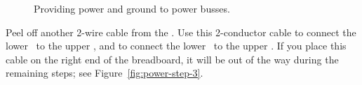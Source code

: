 \begin{figure}
    \centering
    \hfil
    \hfil
    \caption{Providing power and ground to power busses.}
\end{figure}

Peel off another 2-wire cable from the \rainbow.
Use this 2-conductor cable to connect the lower \power\ to the upper \power, and to connect the lower \ground\ to the upper \ground.
If you place this cable on the right end of the breadboard, it will be out of the way during the remaining steps;
see Figure~\ref{fig:power-step-3}. %

